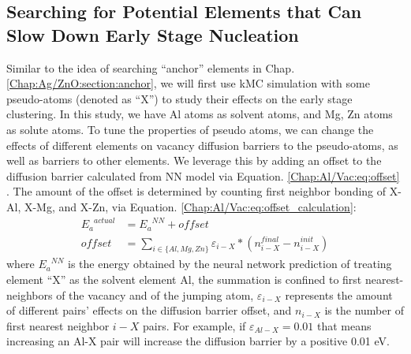 \subsection{Searching for Potential Elements that Can Slow Down Early Stage Nucleation}
\label{Chap:Al/Vac:pseudo}
Similar to the idea of searching ``anchor'' elements in Chap. \ref{Chap:Ag/ZnO:section:anchor}, we will first use \ac{kMC} simulation with some pseudo-atoms (denoted as ``X'') to study their effects on the early stage clustering. In this study, we have Al atoms as solvent atoms, and Mg, Zn atoms as solute atoms. To tune the properties of pseudo atoms, we can change the effects of different elements on vacancy diffusion barriers to the pseudo-atoms, as well as barriers to other elements. We leverage this by adding an offset to the diffusion barrier calculated from \ac{NN} model via Equation. \ref{Chap:Al/Vac:eq:offset} . The amount of the offset is determined by counting first neighbor bonding of X-Al, X-Mg, and X-Zn, via Equation. \ref{Chap:Al/Vac:eq:offset_calculation}:
\begin{subequations}
\begin{align}
{E_a}^{actual} & = {E_a}^{NN} + \textit{offset} \label{Chap:Al/Vac:eq:offset} \\
\textit{offset} & = \sum_{i\in\{Al, Mg, Zn\}} \varepsilon_{i-X} * ( n_{i-X}^{final} - n_{i-X}^{init}) \label{Chap:Al/Vac:eq:offset_calculation}
\end{align}
\end{subequations}
where ${E_a}^{NN}$ is the energy obtained by the neural network prediction of treating element ``X'' as the solvent element Al, the summation is confined to first nearest-neighbors of the vacancy and of the jumping atom, $\varepsilon_{i-X}$ represents the amount of different pairs' effects on the diffusion barrier offset, and $n_{i-X}$ is the number of first nearest neighbor $i-X$ pairs. For example, if $\varepsilon_{Al-X} = 0.01$ that means increasing an Al-X pair will increase the diffusion barrier by a positive 0.01 eV.


